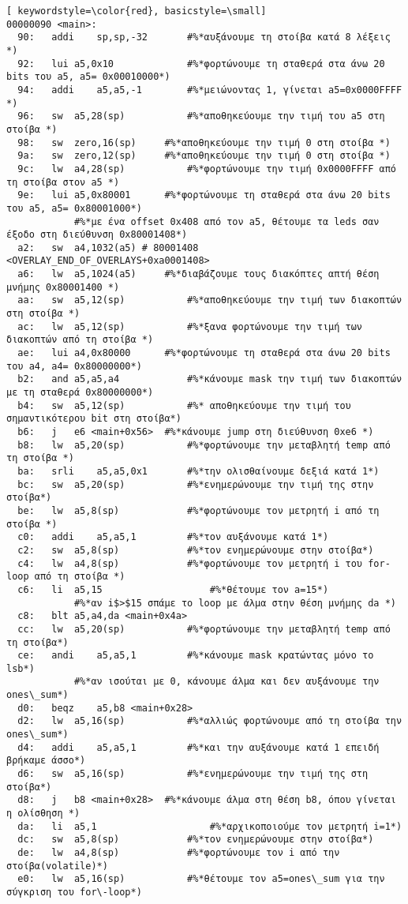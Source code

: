 \documentclass[a4paper]{article}
\begin{document}
\begin{lstlisting}[ keywordstyle=\color{red}, basicstyle=\small]
00000090 <main>:
  90:	addi	sp,sp,-32		#%*αυξάνουμε τη στοίβα κατά 8 λέξεις *)	
  92:	lui	a5,0x10				#%*φορτώνουμε τη σταθερά στα άνω 20 bits του a5, a5= 0x00010000*)	
  94:	addi	a5,a5,-1		#%*μειώνοντας 1, γίνεται a5=0x0000FFFF *)	
  96:	sw	a5,28(sp)			#%*αποθηκεύουμε την τιμή του a5 στη στοίβα *)	
  98:	sw	zero,16(sp)		#%*αποθηκεύουμε την τιμή 0 στη στοίβα *)	
  9a:	sw	zero,12(sp)		#%*αποθηκεύουμε την τιμή 0 στη στοίβα *)	
  9c:	lw	a4,28(sp)			#%*φορτώνουμε την τιμή 0x0000FFFF από τη στοίβα στον a5 *)	
  9e:	lui	a5,0x80001		#%*φορτώνουμε τη σταθερά στα άνω 20 bits του a5, a5= 0x80001000*)	
			#%*με ένα offset 0x408 από τον a5, θέτουμε τα leds σαν έξοδο στη διεύθυνση 0x80001408*)	
  a2:	sw	a4,1032(a5) # 80001408 <OVERLAY_END_OF_OVERLAYS+0xa0001408>
  a6:	lw	a5,1024(a5)		#%*διαβάζουμε τους διακόπτες απτή θέση μνήμης 0x80001400 *)	
  aa:	sw	a5,12(sp)			#%*αποθηκεύουμε την τιμή των διακοπτών στη στοίβα *)	
  ac:	lw	a5,12(sp)			#%*ξανα φορτώνουμε την τιμή των διακοπτών από τη στοίβα *)	
  ae:	lui	a4,0x80000		#%*φορτώνουμε τη σταθερά στα άνω 20 bits του a4, a4= 0x80000000*)	
  b2:	and	a5,a5,a4			#%*κάνουμε mask την τιμή των διακοπτών με τη σταθερά 0x80000000*)	
  b4:	sw	a5,12(sp)			#%* αποθηκεύουμε την τιμή του σημαντικότερου bit στη στοίβα*)	
  b6:	j	e6 <main+0x56>	#%*κάνουμε jump στη διεύθυνση 0xe6 *)	
  b8:	lw	a5,20(sp)			#%*φορτώνουμε την μεταβλητή temp από τη στοίβα *)	
  ba:	srli	a5,a5,0x1		#%*την ολισθαίνουμε δεξιά κατά 1*)	
  bc:	sw	a5,20(sp)			#%*ενημερώνουμε την τιμή της στην στοίβα*)	
  be:	lw	a5,8(sp)			#%*φορτώνουμε τον μετρητή i από τη στοίβα *)	
  c0:	addi	a5,a5,1			#%*τον αυξάνουμε κατά 1*)	
  c2:	sw	a5,8(sp)			#%*τον ενημερώνουμε στην στοίβα*)	
  c4:	lw	a4,8(sp)			#%*φορτώνουμε τον μετρητή i του for-loop από τη στοίβα *)	
  c6:	li	a5,15					#%*θέτουμε τον a=15*)	
			#%*αν i$>$15 σπάμε το loop με άλμα στην θέση μνήμης da *)	
  c8:	blt	a5,a4,da <main+0x4a>
  cc:	lw	a5,20(sp)			#%*φορτώνουμε την μεταβλητή temp από τη στοίβα*)	
  ce:	andi	a5,a5,1			#%*κάνουμε mask κρατώντας μόνο το lsb*)	
			#%*αν ισούται με 0, κάνουμε άλμα και δεν αυξάνουμε την ones\_sum*)	
  d0:	beqz	a5,b8 <main+0x28>
  d2:	lw	a5,16(sp)			#%*αλλιώς φορτώνουμε από τη στοίβα την ones\_sum*)	
  d4:	addi	a5,a5,1			#%*και την αυξάνουμε κατά 1 επειδή βρήκαμε άσσο*)	
  d6:	sw	a5,16(sp)			#%*ενημερώνουμε την τιμή της στη στοίβα*)	
  d8:	j	b8 <main+0x28>	#%*κάνουμε άλμα στη θέση b8, όπου γίνεται η ολίσθηση *)	
  da:	li	a5,1					#%*αρχικοποιούμε τον μετρητή i=1*)	
  dc:	sw	a5,8(sp)			#%*τον ενημερώνουμε στην στοίβα*)	
  de:	lw	a4,8(sp)			#%*φορτώνουμε τον i από την στοίβα(volatile)*)	
  e0:	lw	a5,16(sp)			#%*θέτουμε τον a5=ones\_sum για την σύγκριση του for\-loop*)	

\end{lstlisting}
\end{document}
